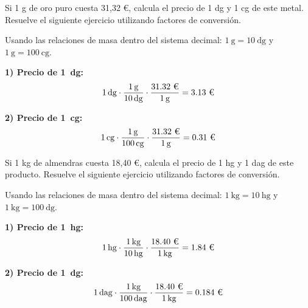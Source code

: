 \begin{exercise}
    Si 1 g de oro puro cuesta 31,32 €, calcula el precio de 1 dg y 1 cg de este metal. Resuelve el siguiente ejercicio utilizando factores de conversión.

    \begin{solu}
        Usando las relaciones de masa dentro del sistema decimal: \( \qty{1}{\g} = \qty{10}{\deci\g} \) y \( \qty{1}{\g} = \qty{100}{\centi\g} \).

        \textbf{1) Precio de \qty{1}{\deci\g}:}
        \[ \qty{1}{\cancel{\deci\g}} \cdot \frac{\qty{1}{\cancel{\g}}}{\qty{10}{\cancel{\deci\g}}} \cdot \frac{\text{31.32 €}}{\qty{1}{\cancel{\g}}} = \text{3.13 €} \]

        \textbf{2) Precio de \qty{1}{\centi\g}:}
        \[ \qty{1}{\cancel{\centi\g}} \cdot \frac{\qty{1}{\cancel{\g}}}{\qty{100}{\cancel{\centi\g}}} \cdot \frac{\text{31.32 €}}{\qty{1}{\cancel{\g}}} = \text{0.31 €} \]
    \end{solu}

\end{exercise}

\begin{exercise}
    Si 1 kg de almendras cuesta 18,40 €, calcula el precio de 1 hg y 1 dag de este producto. Resuelve el siguiente ejercicio utilizando factores de conversión.

    \begin{solu}
        Usando las relaciones de masa dentro del sistema decimal: \( \qty{1}{\kg} = \qty{10}{\hecto\g} \) y \( \qty{1}{\kg} = \qty{100}{\deca\g} \).

        \textbf{1) Precio de \qty{1}{\hecto\g}:}
        \[
        \qty{1}{\cancel{\hecto\g}} \cdot
        \frac{\qty{1}{\cancel{\kg}}}{\qty{10}{\cancel{\hecto\g}}} \cdot
        \frac{\text{18.40 €}}{\qty{1}{\cancel{\kg}}}
        = \text{1.84 €}
        \]

        \textbf{2) Precio de \qty{1}{\deca\g}:}
        \[
        \qty{1}{\cancel{\deca\g}} \cdot
        \frac{\qty{1}{\cancel{\kg}}}{\qty{100}{\cancel{\deca\g}}} \cdot
        \frac{\text{18.40 €}}{\qty{1}{\cancel{\kg}}}
        = \text{0.184 €}
        \]
    \end{solu}

\end{exercise}


